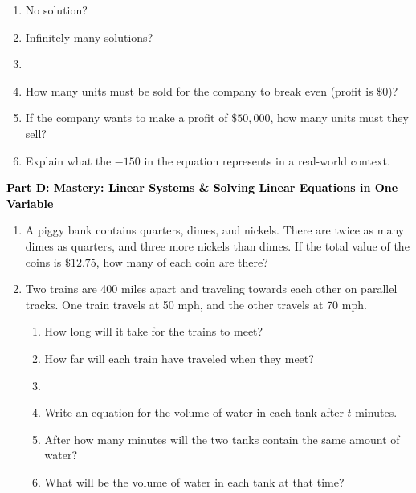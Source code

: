 \documentclass[12pt, letterpaper, fleqn]{article}
\begin{document}
\begin{enumerate}[itemsep=5.5cm, leftmargin=0.6cm, resume]
\vspace{3mm}

\begin{enumerate}[itemsep=5.5cm, leftmargin=0.6cm, resume]
\item No solution?
\item Infinitely many solutions?
\item [label=(\alph*), itemsep=0.5cm]
\item How many units must be sold for the company to break even (profit is $\$0$)?
\item If the company wants to make a profit of $\$50,000$, how many units must they sell?
\item Explain what the $-150$ in the equation represents in a real-world context.
\end{enumerate}

\newpage

\begin{tcolorbox}[colback=customteal!20]
\large\textcolor{black}{\textbf{Part D: Mastery: Linear Systems \& Solving Linear Equations in One Variable}}
\end{tcolorbox}

\vspace{3mm}

\begin{enumerate}[itemsep=5.5cm, leftmargin=0.6cm, resume]
\item A piggy bank contains quarters, dimes, and nickels. There are twice as many dimes as quarters, and three more nickels than dimes. If the total value of the coins is $\$12.75$, how many of each coin are there?
\vspace{4cm}
\item Two trains are 400 miles apart and traveling towards each other on parallel tracks. One train travels at 50 mph, and the other travels at 70 mph.
    \begin{enumerate}[label=(\alph*), itemsep=0.5cm]
\item How long will it take for the trains to meet?
\item How far will each train have traveled when they meet?
\item [label=(\alph*), itemsep=0.5cm]
\item Write an equation for the volume of water in each tank after $t$ minutes.
\item After how many minutes will the two tanks contain the same amount of water?
\item What will be the volume of water in each tank at that time?
\end{enumerate}

\end{enumerate}
\end{enumerate}
\end{document}
